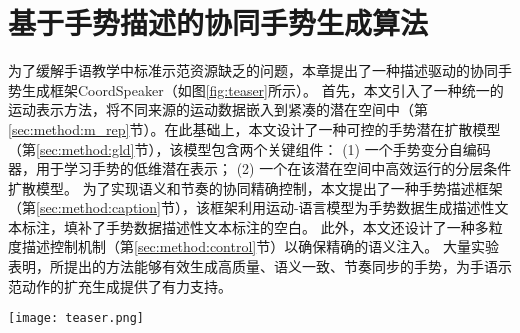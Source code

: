 
\chapter{基于手势描述的协同手势生成算法}
\label{sec:GG} 
为了缓解手语教学中标准示范资源缺乏的问题，本章提出了一种描述驱动的协同手势生成框架CoordSpeaker（如图\ref{fig:teaser}所示）。
首先，本文引入了一种统一的运动表示方法，将不同来源的运动数据嵌入到紧凑的潜在空间中（第\ref{sec:method:m_rep}节）。在此基础上，本文设计了一种可控的手势潜在扩散模型（第\ref{sec:method:gld}节），该模型包含两个关键组件：
(1) 一个手势变分自编码器，用于学习手势的低维潜在表示；
(2) 一个在该潜在空间中高效运行的分层条件扩散模型。
为了实现语义和节奏的协同精确控制，本文提出了一种手势描述框架（第\ref{sec:method:caption}节），该框架利用运动-语言模型为手势数据生成描述性文本标注，填补了手势数据描述性文本标注的空白。
此外，本文还设计了一种多粒度描述控制机制（第\ref{sec:method:control}节）以确保精确的语义注入。
大量实验表明，所提出的方法能够有效生成高质量、语义一致、节奏同步的手势，为手语示范动作的扩充生成提供了有力支持。

\begin{figure*}[!h]
  \centering
  \texttt{[image: teaser.png]}
  \caption{\textbf{CoordSpeaker} 支持手势描述和定制的协同说话者动作生成。}%
  \label{fig:teaser}
\end{figure*}

